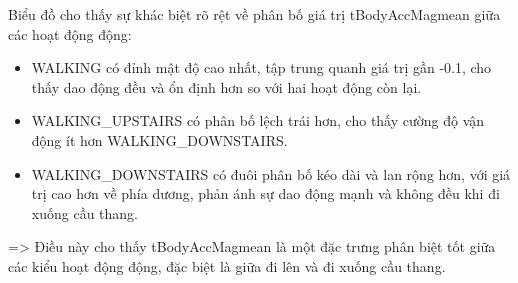 \documentclass[
]{article}
\begin{document}
Biểu đồ cho thấy sự khác biệt rõ rệt về phân bố giá trị tBodyAccMagmean
giữa các hoạt động động:

\begin{itemize}
\item
  WALKING có đỉnh mật độ cao nhất, tập trung quanh giá trị gần -0.1, cho
  thấy dao động đều và ổn định hơn so với hai hoạt động còn lại.
\item
  WALKING\_UPSTAIRS có phân bố lệch trái hơn, cho thấy cường độ vận động
  ít hơn WALKING\_DOWNSTAIRS.
\item
  WALKING\_DOWNSTAIRS có đuôi phân bố kéo dài và lan rộng hơn, với giá
  trị cao hơn về phía dương, phản ánh sự dao động mạnh và không đều khi
  đi xuống cầu thang.
\end{itemize}

=\textgreater{} Điều này cho thấy tBodyAccMagmean là một đặc trưng phân
biệt tốt giữa các kiểu hoạt động động, đặc biệt là giữa đi lên và đi
xuống cầu thang.
\end{document}
